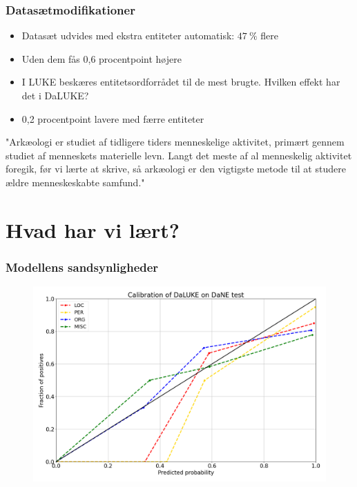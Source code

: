 \documentclass{beamer}
\newcommand{\unit}[1]{\ensuremath{\:\text{#1}}}
\newcommand{\pro}{\ensuremath{\unit{\%{}}}}
\begin{document}
\begin{frame}
    \frametitle{Datasætmodifikationer}
    \begin{itemize}
        \item Datasæt udvides med ekstra entiteter automatisk: $ 47\pro $ flere
        \item Uden dem fås 0,6 procentpoint højere
        \item I LUKE beskæres entitetsordforrådet til de mest brugte. Hvilken effekt har det i DaLUKE?
        \item 0,2 procentpoint lavere med færre entiteter
    \end{itemize}
    \begin{example}
        "Arkæologi er studiet af tidligere tiders {\color{red}menneske}lige {\color{red}aktivitet}, primært gennem studiet af {menneske}ts materielle levn. Langt det meste af al {\color<2>{blue}menneske}lig {aktivitet} foregik, før vi lærte at skrive, så {arkæologi} er den vigtigste metode til at studere ældre {menneske}skabte samfund."
    \end{example}
\end{frame}

\section{Hvad har vi lært?}
\begin{frame}
    \frametitle{Modellens sandsynligheder}
    \begin{figure}[H]
        \centering
            \includegraphics[width=\linewidth]{calibration}
    \end{figure}\noindent
\end{frame}
\end{document}
